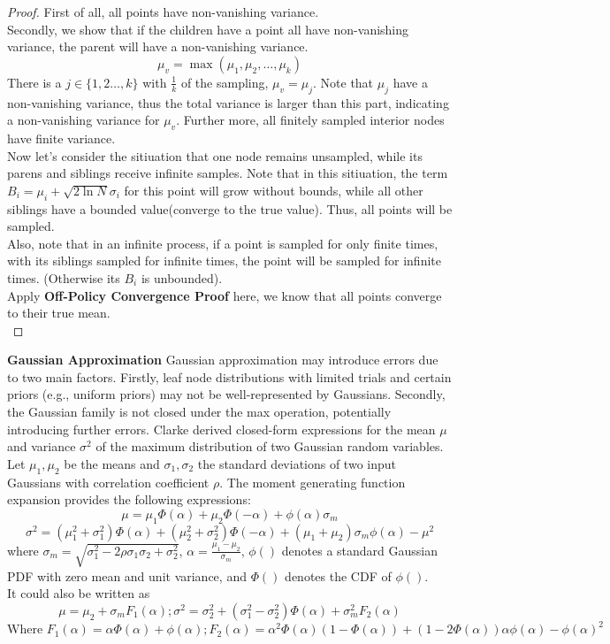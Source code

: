 \documentclass[11pt]{article}
\theoremstyle{definitionstyle}
\begin{document}
\begin{proof} First of all, all points have non-vanishing variance.\\
Secondly, we show that if the children have a point all have non-vanishing variance, the parent will have a non-vanishing variance.\\
\[
    \mu_v=\max(\mu_1,\mu_2,\ldots,\mu_k)
\]
There is a $j\in\{1,2\ldots,k\}$ with $\frac{1}{k}$ of the sampling, $\mu_v=\mu_j$. Note that $\mu_j$ have a non-vanishing variance, thus the total variance is larger than this part, indicating a non-vanishing variance for $\mu_v$. Further more, all ﬁnitely sampled interior nodes have
ﬁnite variance.\\
Now let's consider the sitiuation that one node remains unsampled, while its parens and siblings receive infinite samples. Note that in this sitiuation, the term \(B_i = \mu_i + \sqrt{2 \ln N} \sigma_i\) for this point will grow without bounds, while all other siblings have a bounded value(converge to the true value). Thus, all points will be sampled.\\
Also, note that in an infinite process, if a point is sampled for only finite times, with its siblings sampled for infinite times, the point will be sampled for infinite times. (Otherwise its $B_i$ is unbounded).\\
Apply \textbf{Off-Policy Convergence Proof} here, we know that all points converge to their true mean.\\
\end{proof}
\textbf{Gaussian Approximation} Gaussian approximation may introduce errors due to two main factors. Firstly, leaf node distributions with limited trials and certain priors (e.g., uniform priors) may not be well-represented by Gaussians. Secondly, the Gaussian family is not closed under the max operation, potentially introducing further errors. Clarke \cite{clark1961greatest} derived closed-form expressions for the mean $\mu$ and variance $\sigma^2$ of the maximum distribution of two Gaussian random variables. Let $\mu_1, \mu_2$ be the means and $\sigma_1, \sigma_2$ the standard deviations of two input Gaussians with correlation coefficient $\rho$. The moment generating function expansion provides the following expressions:
\[
\mu = \mu_1\Phi(\alpha) + \mu_2\Phi(-\alpha) + \phi(\alpha)\sigma_m
\]
\[
\sigma^2 = (\mu_1^2 + \sigma_1^2)\Phi(\alpha) + (\mu_2^2 + \sigma_2^2)\Phi(-\alpha) + (\mu_1 + \mu_2)\sigma_m\phi(\alpha) - \mu^2
\]
where $\sigma_m = \sqrt{\sigma_1^2 - 2\rho\sigma_1\sigma_2 + \sigma_2^2}$, $\alpha = \frac{\mu_1 - \mu_2}{\sigma_m}$, $\phi()$ denotes a standard Gaussian PDF with zero mean and unit variance, and $\Phi()$ denotes the CDF of $\phi()$.\\
It could also be written as 
\[
    \mu=\mu_2+\sigma_m F_1(\alpha); \sigma^2=\sigma_2^2+(\sigma_1^2-\sigma_2^2)\Phi(\alpha)+\sigma_m^2F_2(\alpha)
\]
\[
    \text{Where }F_1(\alpha)=\alpha\Phi(\alpha)+\phi(\alpha); F_2(\alpha)=\alpha^2\Phi(\alpha)(1-\Phi(\alpha))+(1-2\Phi(\alpha))\alpha\phi(\alpha)-\phi(\alpha)^2
\]
\end{document}
